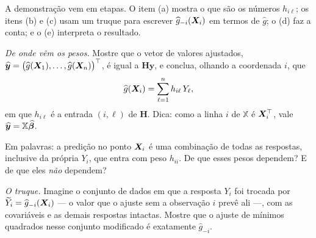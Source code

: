 A demonstração vem em etapas. O item (a) mostra o que são os números $h_{i\ell}$;
os itens (b) e (c) usam um truque para escrever $\widehat g_{-i}(\bm{X}_i)$ em termos de
$\widehat g$; o (d) faz a conta; e o (e) interpreta o resultado.
\begin{itens}
  \item {} \emph{De onde vêm os pesos.} Mostre que o vetor de valores
        ajustados, $\widehat{\bm y}=\big(\widehat g(\bm{X}_1),\dots,\widehat g(\bm{X}_n)\big)^\top$,
        é igual a $\bm H\bm y$, e conclua, olhando a coordenada $i$, que
        \[
          \widehat g(\bm{X}_i)=\sum_{\ell=1}^{n} h_{i\ell}\,Y_\ell ,
        \]
        em que $h_{i\ell}$ é a entrada $(i,\ell)$ de $\bm H$. Dica: como a linha
        $i$ de $\mathbb{X}$ é $\bm{X}_i^\top$, vale $\widehat{\bm y}=\mathbb{X}\widehat{\bm{\beta}}$.

        Em palavras: a predição no ponto $\bm{X}_i$ é uma combinação de todas as
        respostas, inclusive da própria $Y_i$, que entra com peso $h_{ii}$. De que
        esses pesos dependem? E de que eles \emph{não} dependem?
  \item {} \emph{O truque.} Imagine o conjunto de dados em que a resposta
        $Y_i$ foi trocada por $\widetilde Y_i=\widehat g_{-i}(\bm{X}_i)$ --- o valor que o
        ajuste sem a observação $i$ prevê ali ---, com as covariáveis e as demais
        respostas intactas. Mostre que o ajuste de mínimos quadrados nesse conjunto
        modificado é exatamente $\widehat g_{-i}$.


\end{itens}
